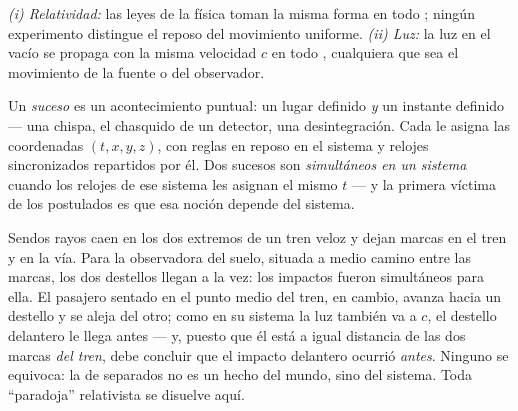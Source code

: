 \begin{theorem}\label{thm:b3:relativistic-kinematics:postulates}
\emph{(i) Relatividad:} las leyes de la física toman la misma forma en todo
; ningún experimento distingue el reposo del movimiento
uniforme. \emph{(ii) Luz:} la luz en el vacío se propaga con la misma
velocidad $c$ en todo , cualquiera que sea el movimiento de
la fuente o del observador.
\end{theorem}
\admitted

\begin{definition}\label{def:b3:relativistic-kinematics:event}
Un \emph{suceso} es un acontecimiento puntual: un lugar definido \emph{y} un
instante definido --- una chispa, el chasquido de un detector, una
desintegración. Cada  le asigna las coordenadas
$(t, x, y, z)$, con reglas en reposo en el sistema y relojes sincronizados
repartidos por él. Dos sucesos son \emph{simultáneos en un sistema} cuando
los relojes de ese sistema les asignan el mismo $t$ --- y la primera víctima
de los postulados es que esa noción depende del sistema.
\end{definition}

\begin{example}\label{ex:b3:relativistic-kinematics:train}
Sendos rayos caen en los dos extremos de un tren veloz y dejan marcas en el
tren y en la vía. Para la observadora del suelo, situada a medio camino
entre las marcas, los dos destellos llegan a la vez: los impactos fueron
simultáneos para ella. El pasajero sentado en el punto medio del tren, en
cambio, avanza hacia un destello y se aleja del otro; como en su sistema la
luz también va a $c$, el destello delantero le llega antes --- y, puesto que
él está a igual distancia de las dos marcas \emph{del tren}, debe concluir
que el impacto delantero ocurrió \emph{antes}. Ninguno se equivoca: la
 de  separados no es un hecho del mundo, sino del
sistema. Toda ``paradoja'' relativista se disuelve aquí.
\end{example}

